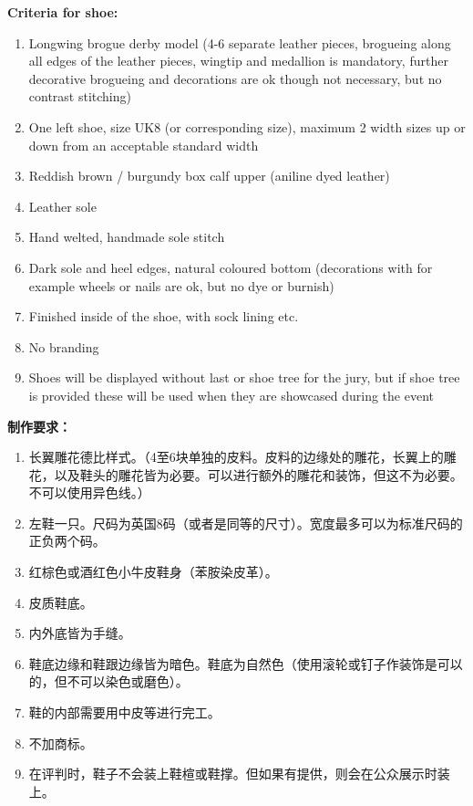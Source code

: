 \begin{paracol}{2}

    \switchcolumn*

    \bgroup\obeylines

        \textbf{Criteria for shoe:}
        \begin{enumerate}
            \item Longwing brogue derby model (4-6 separate leather pieces, brogueing along all edges of the leather pieces, wingtip and medallion is mandatory, further decorative brogueing and decorations are ok though not necessary, but no contrast stitching)
            \item One left shoe, size UK8 (or corresponding size), maximum 2 width sizes up or down from an acceptable standard width
            \item Reddish brown / burgundy box calf upper (aniline dyed leather)
            \item Leather sole
            \item Hand welted, handmade sole stitch
            \item Dark sole and heel edges, natural coloured bottom (decorations with for example wheels or nails are ok, but no dye or burnish)
            \item Finished inside of the shoe, with sock lining etc.
            \item No branding
            \item Shoes will be displayed without last or shoe tree for the jury, but if shoe tree is provided these will be used when they are showcased during the event
        \end{enumerate}

        \newpage

        \switchcolumn
        \textbf{制作要求：}
        \begin{enumerate}
            \item 长翼雕花德比样式。（4至6块单独的皮料。皮料的边缘处的雕花，长翼上的雕花，以及鞋头的雕花皆为必要。可以进行额外的雕花和装饰，但这不为必要。不可以使用异色线。）
            \item 左鞋一只。尺码为英国8码（或者是同等的尺寸）。宽度最多可以为标准尺码的正负两个码。
            \item 红棕色或酒红色小牛皮鞋身（苯胺染皮革）。
            \item 皮质鞋底。
            \item 内外底皆为手缝。
            \item 鞋底边缘和鞋跟边缘皆为暗色。鞋底为自然色（使用滚轮或钉子作装饰是可以的，但不可以染色或磨色）。
            \item 鞋的内部需要用中皮等进行完工。
            \item 不加商标。
            \item 在评判时，鞋子不会装上鞋楦或鞋撑。但如果有提供，则会在公众展示时装上。
        \end{enumerate}
        \switchcolumn*


\end{paracol}
